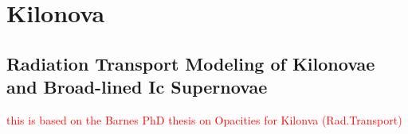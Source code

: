 \documentclass[11pt,a4paper,headinclude=true,DIV=14,BCOR=8mm,chapterprefix,listof=totoc,twoside,openright,abstracton]{scrbook}
\newcommand{\red}[1]{\textcolor{red}{#1}}
\begin{document}











\chapter{Kilonova}

\section{Radiation Transport Modeling of Kilonovae and Broad-lined Ic Supernovae}
\red{this is based on the Barnes PhD thesis on Opacities for Kilonva (Rad.Transport)}
\end{document}
